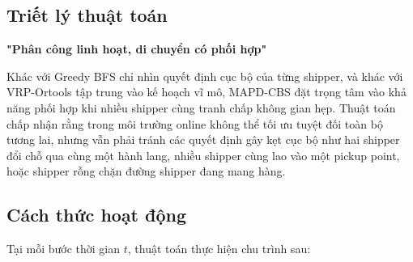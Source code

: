 \documentclass[conference]{IEEEtran}
\begin{document}
\subsection{Triết lý thuật toán}
\begin{center}
    \textbf{"Phân công linh hoạt, di chuyển có phối hợp"}
\end{center}

Khác với Greedy BFS chỉ nhìn quyết định cục bộ của từng shipper, và khác với VRP-Ortools tập trung vào kế hoạch vĩ mô, MAPD-CBS đặt trọng tâm vào khả năng phối hợp khi nhiều shipper cùng tranh chấp không gian hẹp. Thuật toán chấp nhận rằng trong môi trường online không thể tối ưu tuyệt đối toàn bộ tương lai, nhưng vẫn phải tránh các quyết định gây kẹt cục bộ như hai shipper đổi chỗ qua cùng một hành lang, nhiều shipper cùng lao vào một pickup point, hoặc shipper rỗng chặn đường shipper đang mang hàng.

\subsection{Cách thức hoạt động}
Tại mỗi bước thời gian $t$, thuật toán thực hiện chu trình sau:
\end{document}
